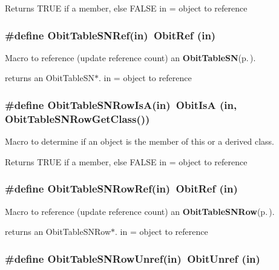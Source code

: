 Returns TRUE if a member, else FALSE in = object to reference 
\subsubsection{\setlength{\rightskip}{0pt plus 5cm}\#define Obit\-Table\-SNRef(in)\ Obit\-Ref (in)}\label{ObitTableSN_8h_a2}


Macro to reference (update reference count) an {\bf Obit\-Table\-SN}{\rm (p.\,\pageref{structObitTableSN})}. 

returns an Obit\-Table\-SN$\ast$. in = object to reference 
\subsubsection{\setlength{\rightskip}{0pt plus 5cm}\#define Obit\-Table\-SNRow\-Is\-A(in)\ Obit\-Is\-A (in, Obit\-Table\-SNRow\-Get\-Class())}\label{ObitTableSN_8h_a6}


Macro to determine if an object is the member of this or a derived class. 

Returns TRUE if a member, else FALSE in = object to reference 
\subsubsection{\setlength{\rightskip}{0pt plus 5cm}\#define Obit\-Table\-SNRow\-Ref(in)\ Obit\-Ref (in)}\label{ObitTableSN_8h_a5}


Macro to reference (update reference count) an {\bf Obit\-Table\-SNRow}{\rm (p.\,\pageref{structObitTableSNRow})}. 

returns an Obit\-Table\-SNRow$\ast$. in = object to reference 
\subsubsection{\setlength{\rightskip}{0pt plus 5cm}\#define Obit\-Table\-SNRow\-Unref(in)\ Obit\-Unref (in)}\label{ObitTableSN_8h_a4}


